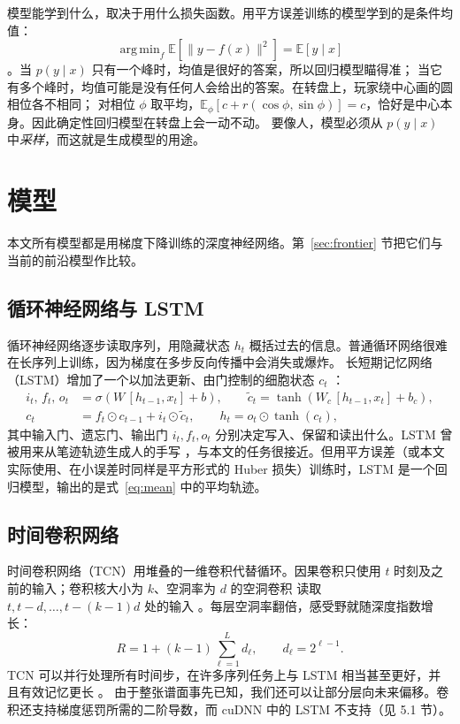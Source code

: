 \documentclass[11pt,a4paper,fontset=windows]{ctexart}
\DeclareMathOperator*{\argmin}{arg\,min}
\newcommand{\E}{\mathbb{E}}
\begin{document}
模型能学到什么，取决于用什么损失函数。用平方误差训练的模型学到的是条件均值：
\begin{equation}
  \argmin_f \E\left[\lVert y-f(x)\rVert^2\right] = \E[y \mid x]
  \label{eq:mean}
\end{equation}
\citep[第 1.5.5 节]{bishop2006}。当 $p(y\mid x)$ 只有一个峰时，均值是很好的答案，所以回归模型瞄得准；
当它有多个峰时，均值可能是没有任何人会给出的答案。在转盘上，玩家绕中心画的圆相位各不相同；
对相位 $\phi$ 取平均，$\E_\phi[c + r(\cos\phi,\sin\phi)] = c$，恰好是中心本身。因此确定性回归模型在转盘上会一动不动。
要像人，模型必须从 $p(y\mid x)$ 中\emph{采样}，而这就是生成模型的用途。

\section{模型}
本文所有模型都是用梯度下降训练的深度神经网络。第~\ref{sec:frontier} 节把它们与当前的前沿模型作比较。

\subsection{循环神经网络与 LSTM}
循环神经网络逐步读取序列，用隐藏状态 $h_t$ 概括过去的信息。普通循环网络很难在长序列上训练，因为梯度在多步反向传播中会消失或爆炸。
长短期记忆网络（LSTM）增加了一个以加法更新、由门控制的细胞状态 $c_t$ \citep{hochreiter1997, gers2000}：
\begin{align}
  i_t,\,f_t,\,o_t &= \sigma\left(W\,[h_{t-1},x_t] + b\right), \qquad
  \tilde c_t = \tanh\left(W_c\,[h_{t-1},x_t] + b_c\right),\\
  c_t &= f_t\odot c_{t-1} + i_t\odot \tilde c_t, \qquad h_t = o_t\odot\tanh(c_t),
\end{align}
其中输入门、遗忘门、输出门 $i_t, f_t, o_t$ 分别决定写入、保留和读出什么。LSTM 曾被用来从笔迹轨迹生成人的手写
\citep{graves2013}，与本文的任务很接近。但用平方误差（或本文实际使用、在小误差时同样是平方形式的 Huber 损失）训练时，LSTM 是一个回归模型，输出的是式~\eqref{eq:mean} 中的平均轨迹。

\subsection{时间卷积网络}
时间卷积网络（TCN）用堆叠的一维卷积代替循环。因果卷积只使用 $t$ 时刻及之前的输入；卷积核大小为 $k$、空洞率为 $d$ 的空洞卷积
读取 $t, t-d, \dots, t-(k-1)d$ 处的输入 \citep{yu2016, oord2016}。每层空洞率翻倍，感受野就随深度指数增长：
\begin{equation}
  R = 1 + (k-1)\sum_{\ell=1}^{L} d_\ell, \qquad d_\ell = 2^{\ell-1}.
\end{equation}
TCN 可以并行处理所有时间步，在许多序列任务上与 LSTM 相当甚至更好，并且有效记忆更长 \citep{bai2018}。
由于整张谱面事先已知，我们还可以让部分层向未来偏移。卷积还支持梯度惩罚所需的二阶导数，而 cuDNN 中的 LSTM 不支持（见 5.1 节）。
\end{document}
